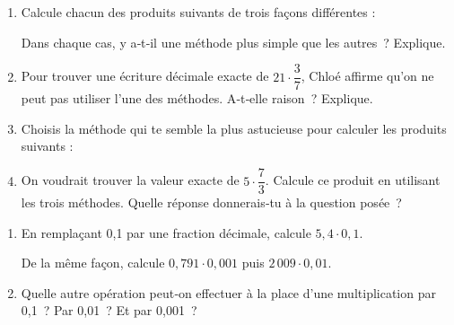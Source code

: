 
\begin{activite}

\begin{partie}
\begin{enumerate}
 \item Calcule chacun des produits suivants de trois façons différentes :
   \vspace{0.3cm}
Dans chaque cas, y a‑t‑il une méthode plus simple que les autres ? Explique.
 \item Pour trouver une écriture décimale exacte de $21 \cdot \dfrac{3}{7}$, Chloé affirme qu'on ne peut pas utiliser l'une des méthodes. A‑t‑elle raison ? Explique.
 \item Choisis la méthode qui te semble la plus astucieuse pour calculer les produits suivants :
 \item On voudrait trouver la valeur exacte de $5 \cdot \dfrac{7}{3}$. Calcule ce produit en utilisant les trois méthodes. Quelle réponse donnerais‑tu à la question posée ?
 \end{enumerate}
\end{partie}

\begin{partie}
\begin{enumerate}
 \item En remplaçant 0,1 par une fraction décimale, calcule $5,4 \cdot 0,1$.
 
De la même façon, calcule $0,791 \cdot 0,001$ puis $2\,009 \cdot 0,01$.
 \item Quelle autre opération peut‑on effectuer à la place d'une multiplication par 0,1 ? Par 0,01 ? Et par 0,001 ?
 \end{enumerate}
\end{partie}


\end{activite}

